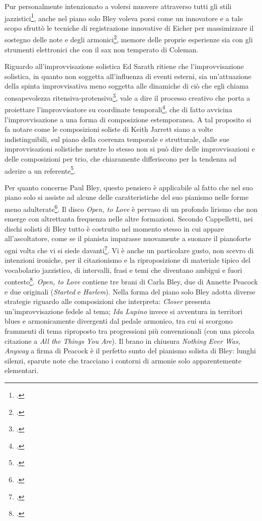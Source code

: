 Pur personalmente intenzionato a volersi muovere attraverso tutti gli stili jazzistici\footcite[5]{smith}, anche nel piano solo Bley voleva porsi come un innovatore e a tale scopo sfruttò le tecniche di registrazione innovative di Eicher per massimizzare il sostegno delle note e degli armonici\footcite[154]{stopping}, memore delle proprie esperienze sia con gli strumenti elettronici che con il sax non temperato di Coleman. \par
Riguardo all'improvvisazione solistica Ed Sarath ritiene che l'improvvisazione solistica, in quanto non soggetta all'influenza di eventi esterni, sia un'attuazione della spinta improvvisativa meno soggetta alle dinamiche di ciò che egli chiama consapevolezza ritensiva-protensiva\footcite[6]{edsarath}, vale a dire il processo creativo che porta a proiettare l'improvvisatore su coordinate temporali\footcite[27]{edsarath}, che di fatto avvicina l'improvvisazione a una forma di composizione estemporanea. A tal proposito si fa notare come le composizioni soliste di Keith Jarrett siano a volte indistinguibili, sul piano della coerenza temporale e strutturale, dalle sue improvvisazioni solistiche mentre lo stesso non si può dire delle improvvisazioni e delle composizioni per trio, che chiaramente differiscono per la tendenza ad aderire a un referente\footcite[20]{edsarath}.\par
Per quanto concerne Paul Bley, questo pensiero è applicabile al fatto che nel suo piano solo si assiste ad alcune delle caratteristiche del suo pianismo nelle forme meno adulterate\footcite[80]{cappelletti}. Il disco \textit{Open, to Love} è pervaso di un profondo lirismo che non emerge con altrettanta frequenza nelle altre formazioni. Secondo Cappelletti, nei dischi solisti di Bley tutto è costruito nel momento stesso in cui appare all'ascoltatore, come se il pianista imparasse nuovamente a suonare il pianoforte ogni volta che vi si siede davanti\footcite[82]{cappelletti}. Vi è anche un particolare gusto, non scevro di intenzioni ironiche, per il citazionismo e la riproposizione di materiale tipico del vocabolario jazzistico, di intervalli, frasi e temi che diventano ambigui e fuori contesto\footcite[83]{cappelletti}. \textit{Open, to Love} contiene tre brani di Carla Bley, due di Annette Peacock e due originali (\textit{Started} e \textit{Harlem}). Nella forma del piano solo Bley adotta diverse strategie riguardo alle composizioni che interpreta: \textit{Closer} presenta un'improvvisazione fedele al tema; \textit{Ida Lupino} invece si avventura in territori blues e armonicamente divergenti dal pedale armonico, tra cui si scorgono frammenti di tema riproposto tra progressioni più convenzionali (con una piccola citazione a \textit{All the Things You Are}). Il brano in chiusura \textit{Nothing Ever Was, Anyway} a firma di Peacock è il perfetto sunto del pianismo solista di Bley: lunghi silenzi, sparute note che tracciano i contorni di armonie solo apparentemente elementari.
